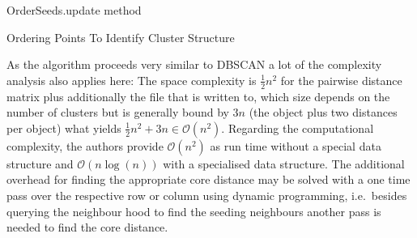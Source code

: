 \begin{algorithm}[htp]
    \hrulealg
\caption{OrderSeeds.update method}\label{order_seeds_update}
\end{algorithm}

\begin{algorithm}[htp]
    \hrulealg
\caption{Ordering Points To Identify Cluster Structure}\label{optics}
\end{algorithm}
As the algorithm proceeds very similar to DBSCAN a lot of the complexity analysis also applies here: The space complexity is $\frac{1}{2}n^2$ for the pairwise distance matrix plus additionally the file that is written to, which size depends on the number of clusters but is generally bound by $3n$ (the object plus two distances per object) what yields $\frac{1}{2}n^2 + 3n \in \mathcal{O}(n^2)$. Regarding the computational complexity, the authors provide $\mathcal{O}(n^2)$ as run time without a special data structure and $\mathcal{O}(n \log(n))$ with a specialised data structure\cite{optics}. The additional overhead for finding the appropriate core distance may be solved with a one time pass over the respective row or column using dynamic programming, i.e.~besides querying the neighbour hood to find the seeding neighbours another pass is needed to find the core distance. \\


